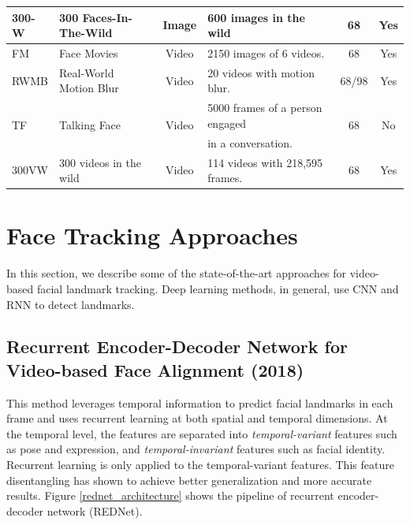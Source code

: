 \documentclass{llncs}
\begin{document}
\begin{table}[]
\begin{center}
\begin{tabular}{|l|l|c|l|c|c|}
            300-W\cite{300-W}  &  300 Faces-In-The-Wild & Image & 600 images in the wild & 68 & Yes \\ 
			\hline
			
			FM\cite{fm} & Face Movies & Video & 2150 images of 6 videos. & 68 & Yes \\ 
			\hline
			
			RWMB\cite{fab} & Real-World Motion Blur & Video & 20 videos with motion blur. & 68/98 & Yes \\ 
			\hline
			
			
			\multirow{2}{*}{TF\cite{tf}}  & \multirow{2}{*}{Talking Face} & \multirow{2}{*}{Video} & 5000 frames of a person engaged & \multirow{2}{*}{68} & \multirow{2}{*}{No}             \\ 
			 &  &  & in a conversation. &  &  \\
			\hline
			
			300VW\cite{300-VW} & 300 videos in the wild  & Video & 114 videos with 218,595 frames. & 68 & Yes \\ 
			\hline
		\end{tabular}
	\label{datasets}
	\end{center}
\end{table}

\section{Face Tracking Approaches}
In this section, we describe some of the state-of-the-art approaches for video-based facial landmark tracking. Deep learning methods, in general, use CNN and RNN to detect landmarks.

\subsection{Recurrent Encoder-Decoder Network for Video-based Face Alignment (2018) \cite{rednet}}
This method leverages temporal information to predict facial landmarks in each frame and uses recurrent learning at both spatial and temporal dimensions. At the temporal level, the features are separated into \textit{temporal-variant} features such as pose and expression, and \textit{temporal-invariant} features such as facial identity. Recurrent learning is only applied to the temporal-variant features. This feature disentangling has shown to achieve better generalization and more accurate results. Figure \ref{rednet_architecture} shows the pipeline of recurrent encoder-decoder network (REDNet). 
\end{document}
